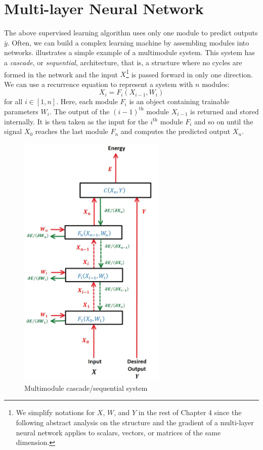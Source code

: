 \section{Multi-layer Neural Network}\label{sec: Systems with Multiple Modules}

The above supervised learning algorithm uses only one module to predict outputs $\bar{y}$.
Often, we can build a complex learning machine by assembling modules into networks.
 illustrates a simple example of a multimodule system.
This system has a \textit{cascade}, or \textit{sequential}, architecture, that is, a structure where no cycles are formed in the network and the input $X$\footnote{We simplify notations for $X$, $W$, and $Y$ in the rest of Chapter 4 since the following abstract analysis on the structure and the gradient of a multi-layer neural network applies to scalars, vectors, or matrices of the same dimension.} is passed forward in only one direction.
We can use a recurrence equation to represent a system with $n$ modules:
\[
X_i = F_i(X_{i-1}, W_i)
\]
for all $i \in [1, n]$.
Here, each module $F_i$ is an object containing trainable parameters $W_i$.
The output of the $(i-1)^\text{th}$ module $X_{i-1}$ is returned and stored internally.
It is then taken as the input for the $i^\text{th}$ module $F_i$ and so on until the signal $X_0$ reaches the last module $F_n$ and computes the predicted output $X_n$.

\begin{figure}[ht]
\centering
\includegraphics[width=70mm]{lectures/01-b/multimodule_cascade.jpg}
\caption{Multimodule cascade/sequential system}
\label{fig: multimodule_cascade}
\end{figure}

